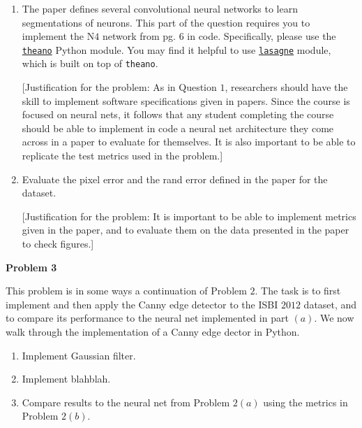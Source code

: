 \documentclass[12pt]{article}
\newcommand{\probnum}[1]
{\large {\bf Problem {#1}}}
\begin{document}
\begin{enumerate}

\item The paper defines several convolutional neural networks to learn segmentations of neurons. This part of the question requires you to implement the N$4$ network from pg. $6$ in code. Specifically, please use the \href{http://deeplearning.net/software/theano/}{\texttt{theano}} Python module. You may find it helpful to use \href{http://lasagne.readthedocs.org/en/latest/}{\texttt{lasagne}} module, which is built on top of \texttt{theano}. 

[Justification for the problem: As in Question $1$, researchers should have the skill to implement software specifications given in papers. Since the course is focused on neural nets, it follows that any student completing the course should be able to implement in code a neural net architecture they come across in a paper to evaluate for themselves. It is also important to be able to replicate the test metrics used in the problem.]

\item Evaluate the pixel error and the rand error defined in the paper for the dataset. 

[Justification for the problem: It is important to be able to implement metrics given in the paper, and to evaluate them on the data presented in the paper to check figures.]

\end{enumerate}


\probnum{3}

This problem is in some ways a continuation of Problem $2$. The task is to first implement and then apply the Canny edge detector to the ISBI $2012$ dataset, and to compare its performance to the neural net implemented in part $(a)$. We now walk through the implementation of a Canny edge dector in Python.

\begin{enumerate}

\item Implement Gaussian filter. 

\item Implement blahblah. 

\item Compare results to the neural net from Problem $2(a)$ using the metrics in Problem $2(b)$. 

\end{enumerate}
\end{document}
